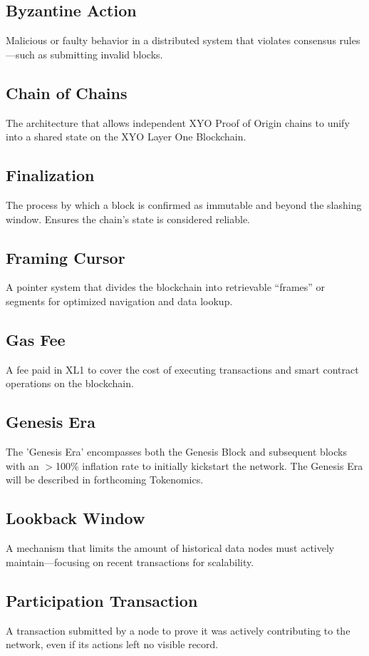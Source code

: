 \documentclass{article}
\begin{document}
\subsection*{Byzantine Action}
Malicious or faulty behavior in a distributed system that violates consensus rules—such as submitting invalid blocks.

\subsection*{Chain of Chains}
The architecture that allows independent XYO Proof of Origin chains to unify into a shared state on the XYO Layer One Blockchain.

\subsection*{Finalization}
The process by which a block is confirmed as immutable and beyond the slashing window. Ensures the chain's state is considered reliable.

\subsection*{Framing Cursor}
A pointer system that divides the blockchain into retrievable “frames” or segments for optimized navigation and data lookup.

\subsection*{Gas Fee}
A fee paid in XL1 to cover the cost of executing transactions and smart contract operations on the blockchain.

\subsection*{Genesis Era}
The 'Genesis Era' encompasses both the Genesis Block and subsequent blocks with an $>$100\% inflation rate to initially kickstart the network. The Genesis Era will be described in forthcoming Tokenomics.

\subsection*{Lookback Window}
A mechanism that limits the amount of historical data nodes must actively maintain—focusing on recent transactions for scalability.

\subsection*{Participation Transaction}
A transaction submitted by a node to prove it was actively contributing to the network, even if its actions left no visible record.
\end{document}
